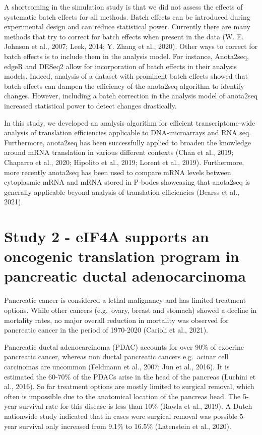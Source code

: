 \documentclass[12pt,openany]{book}
\begin{document}
A shortcoming in the simulation study is that we did not assess the
effects of systematic batch effects for all methods. Batch effects can
be introduced during experimental design and can reduce statistical
power. Currently there are many methods that try to correct for batch
effects when present in the data (W. E. Johnson et al., 2007; Leek,
2014; Y. Zhang et al., 2020). Other ways to correct for batch effects is
to include them in the analysis model. For instance, Anota2seq, edgeR
and DESeq2 allow for incorporation of batch effects in their analysis
models. Indeed, analysis of a dataset with prominent batch effects
showed that batch effects can dampen the efficiency of the anota2seq
algorithm to identify changes. However, including a batch correction in
the analysis model of anota2seq increased statistical power to detect
changes drastically.

In this study, we developed an analysis algorithm for efficient
transcriptome-wide analysis of translation efficiencies applicable to
DNA-microarrays and RNA seq. Furthermore, anota2seq has been
successfully applied to broaden the knowledge around mRNA translation in
various different contexts (Chan et al., 2019; Chaparro et al., 2020;
Hipolito et al., 2019; Lorent et al., 2019). Furthermore, more recently
anota2seq has been used to compare mRNA levels between cytoplasmic mRNA
and mRNA stored in P-bodes showcasing that anota2seq is generally
applicable beyond analysis of translation efficiencies (Bearss et al.,
2021). \newline
\section{Study 2 - eIF4A supports an oncogenic translation program in pancreatic ductal adenocarcinoma}

Pancreatic cancer is considered a lethal malignancy and has limited
treatment options. While other cancers (e.g.~ovary, breast and stomach)
showed a decline in mortality rates, no major overall reduction in
mortality was observed for pancreatic cancer in the period of 1970-2020
(Carioli et al., 2021).

Pancreatic ductal adenocarcinoma (PDAC) accounts for over 90\% of
exocrine pancreatic cancer, whereas non ductal pancreatic cancers
e.g.~acinar cell carcinomas are uncommon (Feldmann et al., 2007; Jun et
al., 2016). It is estimated the 60-70\% of the PDACs arise in the head
of the pancreas (Luchini et al., 2016). So far treatment options are
mostly limited to surgical removal, which often is impossible due to the
anatomical location of the pancreas head. The 5-year survival rate for
this disease is less than 10\% (Rawla et al., 2019). A Dutch nationwide
study indicated that in cases were surgical removal was possible 5-year
survival only increased from 9.1\% to 16.5\% (Latenstein et al., 2020).
\end{document}
